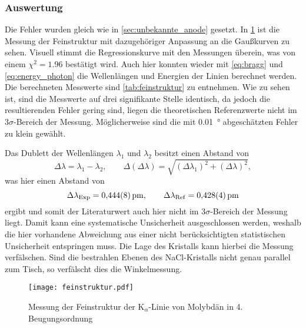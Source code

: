 \subsubsection{Auswertung}

Die Fehler wurden gleich wie in \cref{sec:unbekannte_anode} gesetzt. In \cref{fig:feinstruktur} ist die 
Messung der Feinstruktur mit dazugehöriger Anpassung an die Gaußkurven zu sehen. Visuell stimmt die Regressionskurve 
mit den Messungen überein, was von einem $\chi^2 = 1.96$ bestätigt wird. Auch hier konnten wieder mit 
\cref{eq:bragg} und \cref{eq:energy_photon} die Wellenlängen und Energien der Linien berechnet werden. 
Die berechneten Messwerte sind \cref{tab:feinstruktur} zu entnehmen. Wie zu sehen ist, sind die Messwerte 
auf drei signifikante Stelle identisch, da jedoch die resultierenden Fehler gering sind, liegen die 
theoretischen Referenzwerte nicht im $3\sigma$-Bereich der Messung. Möglicherweise sind die mit \SI{0.01}{\degree}
abgeschätzten Fehler zu klein gewählt.\par 
Das Dublett der Wellenlängen $\lambda_1$ und $\lambda_2$ besitzt einen Abstand von 
\begin{equation*}
	\Delta\lambda = \lambda_1 - \lambda_2,\qquad \Delta(\Delta\lambda) = 
	\sqrt{(\Delta\lambda_1)^2+ (\Delta\lambda)^2},
\end{equation*}
was hier einen Abstand von 
\begin{equation}
	\Delta\lambda_\mathrm{Exp} = \SI{0.444\pm 0.008}{\pm},\qquad
	\Delta\lambda_\mathrm{Ref} = \SI{0.428\pm0.004}{\pm}
\end{equation}
ergibt und somit der Literaturwert auch hier nicht im $3\sigma$-Bereich der Messung liegt. Damit kann eine 
systematische Unsicherheit ausgeschlossen werden, weshalb die hier vorhandene Abweichung 
aus einer nicht berücksichtigten statistischen Unsicherheit entspringen muss. Die Lage des Kristalls 
kann hierbei die Messung verfälschen. Sind die bestrahlen Ebenen des NaCl-Kristalls nicht 
genau parallel zum Tisch, so verfälscht dies die Winkelmessung.

\begin{figure}[htb]
	\centering
	\texttt{[image: feinstruktur.pdf]}
	\caption{Messung der Feinstruktur der K$_\alpha$-Linie von Molybdän in 4. Beugungsordnung}
	\label{fig:feinstruktur}
\end{figure}

